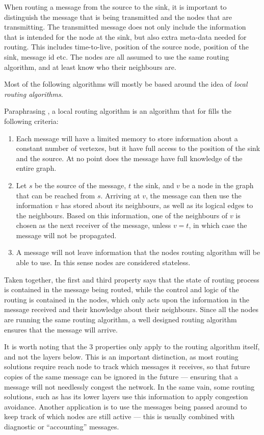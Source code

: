 \documentclass[letter, 12pt, english, draft]{article}
\begin{document}
When routing a message from the source to the sink, it is important to distinguish the message that is being transmitted and the nodes that are transmitting. The transmitted message does not only include the information that is intended for the node at the sink, but also extra meta-data needed for routing. This includes time-to-live, position of the source node, position of the sink, message id etc. The nodes are all assumed to use the same routing algorithm, and at least know who their neighbours are.

Most of the following algorithms will mostly be based around the idea of \emph{local routing algorithms}. 

Paraphrasing \cite{compass}, a local routing algorithm is an algorithm that for fills the following criteria:
\begin{enumerate}
\item Each message will have a limited memory to store information about a constant number of vertexes, but it have full access to the position of the sink and the source. At no point does the message have full knowledge of the entire graph. 
\item Let $s$ be the source of the message, $t$ the sink, and $v$ be a node in the graph that can be reached from $s$. Arriving at $v$, the message can then use the information $v$ has stored about its neighbours, as well as its logical edges to the neighbours. Based on this information, one of the neighbours of $v$ is chosen as the next receiver of the message, unless $v = t$, in which case the message will not be propagated.
\item A message will not leave information that the nodes routing algorithm will be able to use. In this sense nodes are considered stateless.\end{enumerate}

Taken together, the first and third property says that the state of routing process is contained in the message being routed, while the control and logic of the routing is contained in the nodes, which only acts upon the information in the message received and their knowledge about their neighbours. Since all the nodes are running the same routing algorithm, a well designed routing algorithm ensures that the message will arrive.

\label{record-recived}
It is worth noting that the 3 properties only apply to the routing algorithm itself, and not the layers below. This is an important distinction, as most routing solutions require reach node to track which messages it receives, so that future copies of the same message can be ignored in the future --- ensuring that a message will not needlessly congest the network. In the same vain, some routing solutions, such as \cite{speed} has its lower layers use this information to apply congestion avoidance. Another application is to use the messages being passed around to keep track of which nodes are still active --- this is usually combined with diagnostic or ``accounting'' messages. 
\end{document}
